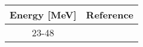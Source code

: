 \begin{tabular}{c c} 
    \toprule 
    \bf{Energy [MeV]} & \bf{Reference} \\
    \midrule
    23-48 & \cite{Carlson94}\\
    \bottomrule
\end{tabular}
